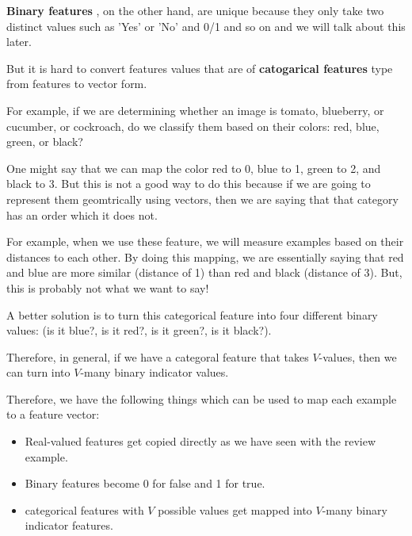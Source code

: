 \documentclass{article}
\begin{document}
\vspace{0.5cm}

\textbf{Binary features} , on the other hand, are unique because they only take two distinct values such as 'Yes' or 'No' and 0/1 and so on and we will talk about this later.

\vspace{0.5cm}

But it is hard to convert features values that are of \textbf{catogarical features} type from features to vector form.

\vspace{0.5cm}

For example, if we are determining whether an image is tomato, blueberry, or cucumber, or cockroach, do we classify them based on their colors: red, blue, green, or black?

\vspace{0.5cm}

One might say that we can map the color red to 0, blue to 1, green to 2, and black to 3. But this is not a good way to do this because if we are going to represent them geomtrically using vectors, then we are saying that that category has an order which it does not.

\vspace{0.5cm}

For example, when we use these feature, we will measure examples based on their distances to each other. By doing this mapping, we are essentially saying that red and blue are more similar (distance of 1) than red and black (distance of 3). But, this is probably not what we want to say!

\vspace{0.5cm}

A better solution is to turn this categorical feature into four different binary values: (is it blue?, is it red?, is it green?, is it black?).

\vspace{0.5cm}

Therefore, in general, if we have a categoral feature that takes $V$-values, then we can turn into $V$-many binary indicator values.

\vspace{0.5cm}

Therefore, we have the following things which can be used to map each example to a feature vector:

\begin{itemize}
    \item Real-valued features get copied directly as we have seen with the review example.
    \item Binary features become 0 for false and 1 for true.
    \item categorical features with $V$ possible values get mapped into $V$-many binary indicator features.
\end{itemize}
\end{document}
